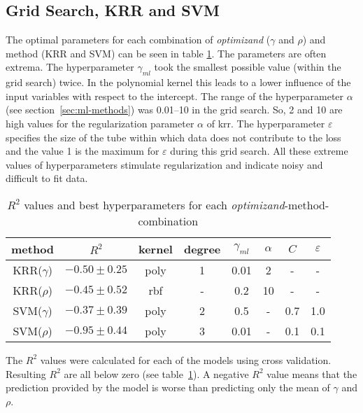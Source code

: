 %


\subsection{Grid Search, KRR and SVM}
The optimal parameters for each combination of 
\textit{optimizand} ($\gamma$ and $\rho$) and method (KRR and SVM) 
can be seen in table \ref{tab:grid-search}. 
The parameters are often extrema.
The hyperparameter $\gamma_{ml}$ took the smallest possible value (within the grid search) twice. 
In the polynomial kernel this leads to a lower influence of the input variables with respect to the intercept. 
The range of the hyperparameter $\alpha$ (see section~\ref{sec:ml-methods}) was 0.01--10 in the grid search. 
So, 2 and 10 are high values for the regularization parameter $\alpha$ of \gls{krr}.
The hyperparameter $\varepsilon$ specifies the size of the tube within which data does not contribute to the loss 
and the value 1 is the maximum for $\varepsilon$ during this grid search. 
All these extreme values of hyperparameters stimulate regularization and indicate noisy and difficult to fit data.
\begin{table}
    \center
    \begin{tabular}{cccccccc}
        \hline\hline
        method  &$R^2$   &kernel &degree &$\gamma_{ml}$   &$\alpha$    &$C$    &$\varepsilon$\\
        \hline
        KRR($\gamma$) & $-0.50 \pm 0.25$  &poly   &1  &0.01   &2 &-&-\\
        KRR($\rho  $) & $-0.45 \pm 0.52$  &rbf    &-   &0.2   &10&-&-\\
        SVM($\gamma$) & $-0.37 \pm 0.39$  &poly   &2  &0.5    &-&0.7  &1.0  \\
        SVM($\rho  $) & $-0.95 \pm 0.44$  &poly   &3  &0.01   &-&0.1  &0.1  \\
        \hline\hline
    \end{tabular}
    \caption{$R^2$ values and best hyperparameters for each \textit{optimizand}-method-combination}
    \label{tab:grid-search}
\end{table}
The $R^2$ values were calculated for each of the models using cross validation. 
Resulting $R^2$ are all below zero (see table~\ref{tab:grid-search}). 
A negative $R^2$ value means that the prediction provided by the model is worse than predicting only the mean of $\gamma$ and $\rho$. 

